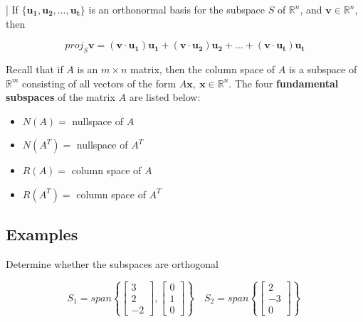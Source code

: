 \documentclass{report}
\begin{document}
\begin{tcolorbox}[title = Projection onto a Subspace]]
	If $\{ \bm{u_1}, \bm{u_2}, \hdots, \bm{u_t}\}$ is an orthonormal basis for the subspace $S$ of $\mathbb{R}^n$, and $\bm{v} \in \mathbb{R}^n$, then 
	
	$$
	proj_S  \bm{v} = (\bm{v} \cdot \bm{u_1}) \bm{u_1} + (\bm{v} \cdot \bm{u_2}) \bm{u_2} + \hdots + (\bm{v} \cdot \bm{u_t}) \bm{u_t}
	$$
\end{tcolorbox}

\begin{tcolorbox}[title = Funbdamental Subspaces of a Matrix]
	Recall that if $A$ is an $m \times n$ matrix, then the column space of $A$ is a subspace of $\mathbb{R}^m$ consisting of all vectors of the form $A\bm{x}, \ \bm{x} \in \mathbb{R}^n$. The four \textbf{fundamental subspaces} of the matrix $A$ are listed below:
	
	\begin{itemize}
		\item $N(A) = $ nullspace of $A$
		\item $N(A^T) = $ nullspace of $A^T$
		\item $R(A) = $ column space of $A$
		\item $R(A^T) = $ column space of $A^T$
	\end{itemize}
\end{tcolorbox}

\subsection{Examples}

\begin{tcolorbox}[colframe = lightred]
	Determine whether the subspaces are orthogonal
	
	$$
	S_1 = span \left\{ \begin{bmatrix} 3 \\ 2 \\ -2 \end{bmatrix}, \begin{bmatrix} 0 \\ 1 \\ 0 \end{bmatrix}\right\} \quad S_2 = span \left\{ \begin{bmatrix} 2 \\ -3 \\ 0 \end{bmatrix} \right\}\
	$$
\end{tcolorbox}
\end{document}
